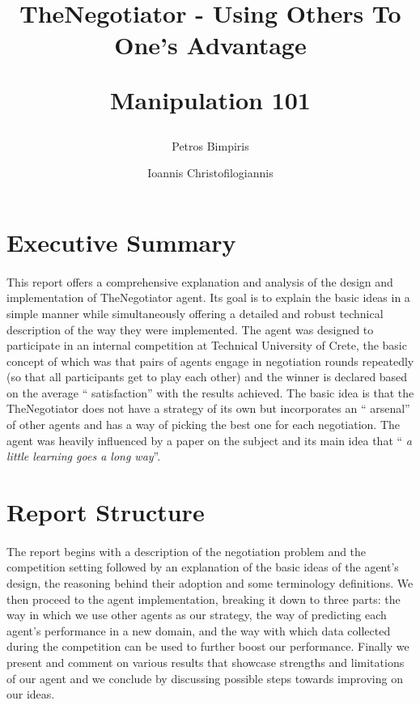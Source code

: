 \documentclass[12pt]{article}
\author{%
	Petros Bimpiris
	\and
	Ioannis Christofilogiannis
}
\date{
	\begin{center}
	\hspace{2.5cm}Technical University of Crete
	\newline
	\phantom{--------------}Multiagent Systems (COMP512)		%
	\newline
	February 2024 
	\end{center}
	\vspace{-0.5cm}
}
\title{
	\vspace{-2cm}
	\textbf{TheNegotiator - Using Others To One's Advantage}

	Manipulation 101
}
\numberwithin{equation}{section}
\newcommand{\quotes}[1]{\textquotedblleft{} #1\textquotedblright}
\begin{document}
 

	\maketitle

	\section*{Executive Summary}	\label{sec:execuctive_summary}		%

		\paragraph*{}
			This report offers a comprehensive explanation and analysis of the design and implementation of TheNegotiator agent. Its goal is to explain the basic ideas in a simple manner while simultaneously offering a detailed and robust technical description of the way they were implemented.
			The agent was designed to participate in an internal competition at Technical University of Crete, the basic concept of which was that pairs of agents engage in negotiation rounds repeatedly (so that all participants get to play each other) and the winner is declared based on the average \quotes{satisfaction} with the results achieved.
			The basic idea is that the TheNegotiator does not have a strategy of its own but incorporates an \quotes{arsenal} of other agents and has a way of picking the best one for each negotiation. The agent was heavily influenced by a paper on the subject \cite{meta_agent_paper} and its main idea that \quotes{\emph{a little learning goes a long way}}.


	\section*{Report Structure}	\label{sec:report_structure}		%

		\paragraph*{}
			The report begins with a description of the negotiation problem and the competition setting followed by an explanation of the basic ideas of the agent's design, the reasoning behind their adoption and some terminology definitions.
			We then proceed to the agent implementation, breaking it down to three parts: the way in which we use other agents as our strategy, the way of predicting each agent's performance in a new domain, and the way with which data collected during the competition can be used to further boost our performance. Finally we present and comment on various results that showcase strengths and limitations of our agent and we conclude by discussing possible steps towards improving on our ideas.
			\hfill
\end{document}
